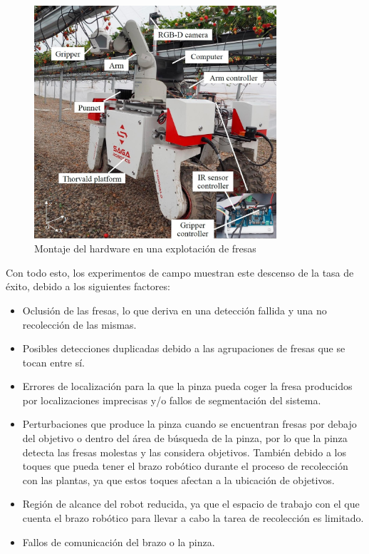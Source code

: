 \begin{figure} [H]
    \begin{center}
      \includegraphics[width=9cm]{figs/Hardware assembly in a strawberry farm.jpg}
    \end{center}
    \caption{Montaje del hardware en una explotación de fresas}
    \label{fig:Robot_Xiong}
\end{figure}

Con todo esto, los experimentos de campo muestran %
este descenso de la tasa de éxito, debido a los siguientes factores:

\begin{itemize}
    \item Oclusión de las fresas, lo que deriva en una detección fallida y una no recolección de las mismas.
    \item Posibles detecciones duplicadas debido a las agrupaciones de fresas que se tocan entre sí.
    \item Errores de localización %
    para la que la pinza pueda coger la fresa producidos por localizaciones imprecisas y/o fallos de segmentación del sistema.%
    \item Perturbaciones que produce la pinza cuando se encuentran fresas por debajo del objetivo o dentro del área de búsqueda de la pinza, por lo que la pinza detecta las fresas molestas y las considera objetivos. También debido a los toques que pueda tener el brazo robótico durante el proceso de recolección con las plantas, ya que estos toques afectan a la ubicación de objetivos.
    \item Región de alcance del robot reducida, ya que el espacio de trabajo con el que cuenta el brazo robótico para llevar a cabo la tarea de recolección es limitado.
    \item Fallos de comunicación del brazo o la pinza.
\end{itemize}

